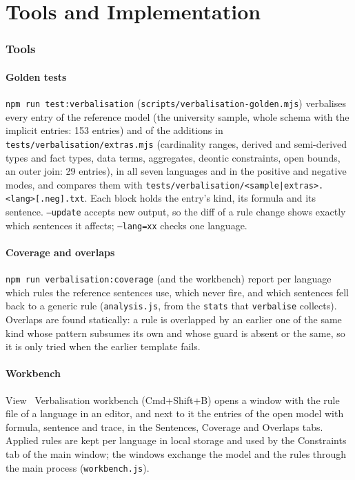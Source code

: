 \documentclass[11pt, a4paper]{article}
\newcommand{\code}[1]{\texttt{\color{codefg}#1}}
\begin{document}
\part{Tools and Implementation}

\section{Tools}
\label{sec:tools}

\subsection{Golden tests}

\code{npm run test:verbalisation} (\code{scripts/verbalisation-golden.mjs})
verbalises every entry of the reference model (the university sample, whole
schema with the implicit entries: 153 entries) and of the additions in
\code{tests/verbalisation/extras.mjs} (cardinality ranges, derived and
semi-derived types and fact types, data terms, aggregates, deontic
constraints, open bounds, an outer join: 29 entries), in all seven languages
and in the positive and negative modes, and compares them with
\code{tests/verbalisation/<sample|extras>.<lang>[.neg].txt}. Each block holds
the entry's kind, its formula and its sentence. \code{--update} accepts new
output, so the diff of a rule change shows exactly which sentences it
affects; \code{--lang=xx} checks one language.

\subsection{Coverage and overlaps}

\code{npm run verbalisation:coverage} (and the workbench) report per
language which rules the reference sentences use, which never fire, and
which sentences fell back to a generic rule (\code{analysis.js}, from the
\code{stats} that \code{verbalise} collects). Overlaps are found statically:
a rule is overlapped by an earlier one of the same kind whose pattern
subsumes its own and whose guard is absent or the same, so it is only tried
when the earlier template fails.

\subsection{Workbench}

View \textrightarrow\ Verbalisation workbench (Cmd+Shift+B) opens a window with the rule file of a
language in an editor, and next to it the entries of the open model with
formula, sentence and trace, in the Sentences, Coverage and Overlaps tabs.
Applied rules are kept per language in local storage and used by the
Constraints tab of the main window; the windows exchange the model and the
rules through the main process (\code{workbench.js}).
\end{document}
